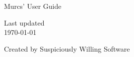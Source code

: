 \begin{titlepage}
\begin{centering}
\huge{Murcs' User Guide}

\vspace{1cm}

\large{Last updated \\ \today}

\vfill

\large{Created by Suspiciously Willing Software \textregistered}

\end{centering}
\thispagestyle{empty}
\end{titlepage}

